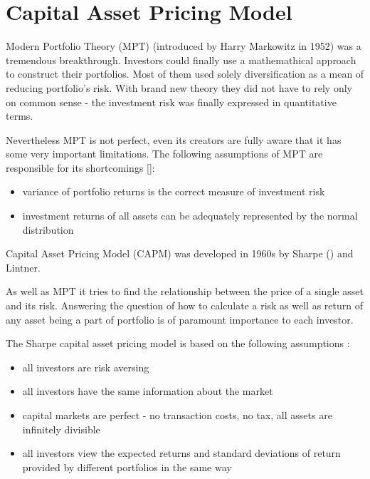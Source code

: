
\section{Capital Asset Pricing Model}
\label{CAPM}


Modern Portfolio Theory (MPT) (introduced by Harry Markowitz in 1952) was a tremendous breakthrough. 
Investors could finally use a mathemathical approach to construct their portfolios.
Most of them used solely diversification as a mean of reducing portfolio's risk.
With brand new theory they did not have to rely only on common sense - the investment risk was finally expressed in quantitative terms. 

Nevertheless MPT is not perfect, even its creators are fully aware that it has some very important limitations.
The following assumptions of MPT are responsible for its shortcomings [\cite{MPT}]:
\begin{itemize}
  \item variance of portfolio returns is the correct measure of investment risk
  \item investment returns of all assets can be adequately represented by the normal distribution
\end{itemize}

  

Capital Asset Pricing Model (CAPM) was developed in 1960s by Sharpe (\cite{CAPM-Sharpe}) and Lintner.
 
As well as MPT it tries to find the relationship between the price of a single asset and its risk.
Answering the question of how to calculate a risk as well as return of any asset being a part of portfolio is of paramount importance to each investor.

The Sharpe capital asset pricing model is based on the following assumptions \cite{CAPM}:

\begin{itemize}
  \item all investors are risk aversing
  \item all investors have the same information about the market
  \item capital markets are perfect - no transaction costs, no tax, all assets are infinitely divisible
  \item all investors view the expected returns and standard deviations of return provided by different portfolios in the same way
\end{itemize}
 
